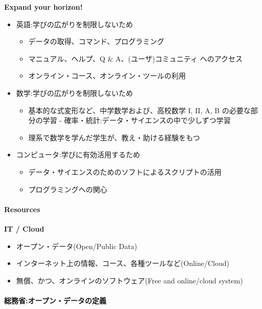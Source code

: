 \documentclass[
]{bxjsbook}
\providecommand{\tightlist}{%
  \setlength{\itemsep}{0pt}\setlength{\parskip}{0pt}}
\theoremstyle{definition}
\theoremstyle{definition}
\theoremstyle{definition}
\theoremstyle{definition}
\theoremstyle{remark}
\begin{document}
\textbf{Expand your horizon!}

\begin{itemize}
\tightlist
\item
  英語:学びの広がりを制限しないため

  \begin{itemize}
  \tightlist
  \item
    データの取得、コマンド、プログラミング
  \item
    マニュアル、ヘルプ、Q \& A、(ユーザ)コミュニティ へのアクセス\\
  \item
    オンライン・コース、オンライン・ツールの利用
  \end{itemize}
\item
  数学:学びの広がりを制限しないため

  \begin{itemize}
  \tightlist
  \item
    基本的な式変形など、中学数学および、高校数学 I, II, A, B の必要な部分の学習 - 確率・統計:データ・サイエンスの中で少しずつ学習
  \item
    理系で数学を学んだ学生が、教え・助ける経験をもつ
  \end{itemize}
\item
  コンピュータ:学びに有効活用するため

  \begin{itemize}
  \tightlist
  \item
    データ・サイエンスのためのソフトによるスクリプトの活用
  \item
    プログラミングへの関心
  \end{itemize}
\end{itemize}

\hypertarget{resources}{%
\paragraph{Resources}\label{resources}}

\textbf{IT / Cloud}

\begin{itemize}
\tightlist
\item
  オープン・データ(Open/Public Data)
\item
  インターネット上の情報、コース、各種ツールなど(Online/Cloud)
\item
  無償、かつ、オンラインのソフトウェア(Free and online/cloud system)
\end{itemize}

\hypertarget{ux7dcfux52d9ux7701ux30aaux30fcux30d7ux30f3ux30c7ux30fcux30bfux306eux5b9aux7fa9}{%
\paragraph{総務省:オープン・データの定義}\label{ux7dcfux52d9ux7701ux30aaux30fcux30d7ux30f3ux30c7ux30fcux30bfux306eux5b9aux7fa9}}
\end{document}
